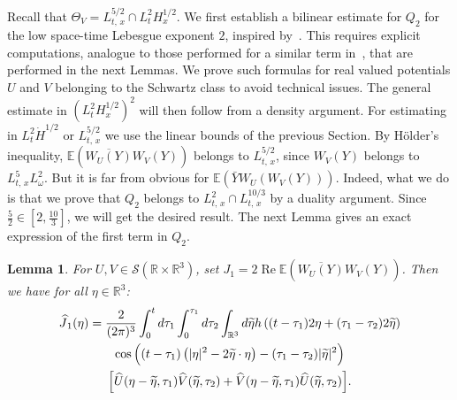 \documentclass[10pt]{amsart}
\newtheorem{lemm}[theo]{Lemma}\newtheorem{prop}[theo]{Proposition}\newtheorem{coro}[theo]{Corollary}\newtheorem{conj}[theo]{Conjecture}
\theoremstyle{definition}\newtheorem{defi}[theo]{Definition}\newtheorem{rema}[theo]{Remark}\newtheorem{exam}[theo]{Example}\newtheorem{exem}[theo]{Example}\newtheorem{nota}[theo]{Notation}
\newcommand{\R}{\mathbb{R}}
\newcommand{\E}{\mathbb{E}}
\DeclareMathOperator{\Rel}{Re}
\newcommand{\mclS}{\mathcal{S}}
\let\oldtilde\tilde
\renewcommand*{\tilde}[1]{\mathchoice{\widetilde{#1}}{\widetilde{#1}}{\oldtilde{#1}}{\oldtilde{#1}}}
\let\oldhat\hat
\renewcommand*{\hat}[1]{\mathchoice{\widehat{#1}}{\widehat{#1}}{\oldhat{#1}}{\oldhat{#1}}}
\begin{document}
Recall that $\Theta_V= L^{5/2}_{t,\,x}\cap L^2_{t}H^{1/2}_x$. We first establish a bilinear estimate for $Q_2$ for the low space-time Lebesgue exponent $2$, inspired by~\cite{lewsab2}. This requires explicit computations, analogue to those performed for a similar term in~\cite{lewsab2}, that are performed in the next Lemmas. We prove such formulas for real valued potentials $U$ and $V$ belonging to the Schwartz class to avoid technical issues. The general estimate in $(L^2_{t}H^{1/2}_x)^2$ will then follow from a density argument. For estimating in $L^2_t\dot H^{1/2}$ or $L^{5/2}_{t,\,x}$ we use the linear bounds of the previous Section. By H\"older's inequality, $\E(\overline{W_U(Y)} W_V(Y))$ belongs to $L^{5/2}_{t,\,x}$, since $W_V(Y)$ belongs to $L^5_{t,\,x} L^2_\omega$. But it is far from obvious for $\E(\bar Y W_U(W_V(Y)))$. Indeed, what we do is that we prove that $Q_2$ belongs to $L^2_{t,\,x}\cap L^{10/3}_{t,\,x}$ by a duality argument. Since $\frac52 \in [2,\frac{10}{3}]$, we will get the desired result. The next Lemma gives an exact expression of the first term in $Q_2$.


\begin{lemm}\label{lem:exprQ21}
For $U,V \in  \mclS(\R\times \R^3)$, set $J_1 = 2\Rel\E(\overline{W_U(Y)} W_V(Y))$. Then we have for all $\eta \in \R^3$:
\begin{multline*}
\hat J_1(\eta) = \frac{2}{(2\pi)^3}\int_{0}^td\tau_1 \int_{0}^{\tau_1}d\tau_2 \int_{\R^3} d\tilde{\eta} h\left((t-\tau_1)2\eta + (\tau_1-\tau_2) 2\tilde{\eta}\right)\\
\cos\Big((t-\tau_1)\left(|\eta|^2-2\tilde{\eta}\cdot \eta\right)-(\tau_1-\tau_2)|\tilde{\eta}|^2 \Big)\\
\Big[\hat U(\eta-\tilde{\eta},\tau_1) \hat V(\tilde{\eta},\tau_2)+ \hat V(\eta-\tilde{\eta},\tau_1) \hat U(\tilde{\eta},\tau_2)\Big].
\end{multline*}
\end{lemm}
\end{document}
